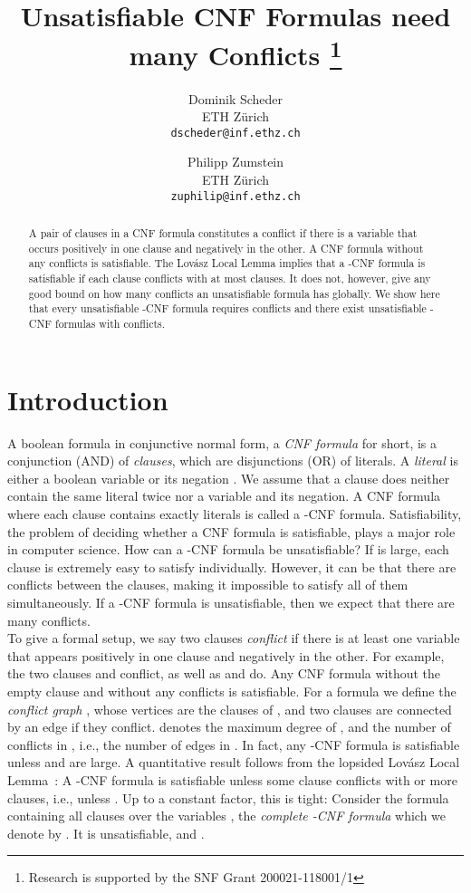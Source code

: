 \documentclass[a4paper, 11pt]{article}
\title{Unsatisfiable CNF Formulas need many Conflicts
\thanks{Research is  supported by the SNF Grant 200021-118001/1}
}
\author{Dominik Scheder\\ 
  ETH Z\"urich\\
  \texttt{dscheder@inf.ethz.ch} \and
  Philipp Zumstein\\
  ETH Z\"urich\\
  \texttt{zuphilip@inf.ethz.ch}}
\begin{document}
\maketitle

\begin{abstract} A pair of clauses in a CNF formula constitutes a
  conflict if there is a variable that occurs positively in one clause
  and negatively in the other. A CNF formula without any conflicts is
  satisfiable. The Lov\'asz Local Lemma implies that a -CNF formula
is satisfiable if each clause conflicts with at most
   clauses. It does not, however, give any good bound
  on how many conflicts an unsatisfiable formula has globally. We show
  here that every unsatisfiable -CNF formula requires
   conflicts and there exist unsatisfiable -CNF
  formulas with  conflicts.
\end{abstract}

\section{Introduction}

A boolean formula in conjunctive normal form, a {\em CNF formula} for
short, is a conjunction (AND) of {\em clauses}, which are disjunctions
(OR) of literals. A {\em literal} is either a boolean variable  or
its negation .  We assume that a clause does neither contain
the same literal twice nor a variable and its negation. A CNF formula
where each clause contains exactly  literals is called a -CNF
formula.  Satisfiability, the problem of deciding whether a CNF
formula is satisfiable, plays a major role in computer science.  How
can a -CNF formula be unsatisfiable?  If  is large, each clause
is extremely easy to satisfy individually.  However, it can be that
there are conflicts between the clauses, making it impossible to
satisfy all of them simultaneously.  If a -CNF formula is
unsatisfiable,
then we expect that there are many conflicts.\\

To give a formal setup, we say two clauses {\em conflict} if there is
at least one variable that appears positively in one clause and
negatively in the other. For example, the two clauses  and
 conflict, as well as  and  do.  Any CNF formula without the empty clause and
without any conflicts is satisfiable.  For a formula  we define the
{\em conflict graph} , whose vertices are the clauses of ,
and two clauses are connected by an edge if they conflict. 
denotes the maximum degree of , and  the number of
conflicts in , i.e., the number of edges in .  In fact, any
-CNF formula is satisfiable unless  and  are
large. A quantitative result follows from the lopsided Lov\'asz Local
Lemma~\cite{ES1991,AS2000,LS2007}: A -CNF formula  is
satisfiable unless some clause conflicts with  or more
clauses, i.e., unless . Up to a constant
factor, this is tight: Consider the formula containing all 
clauses over the variables , the {\em complete
  -CNF formula} which we denote by .  It is
unsatisfiable, and
.\\
\end{document}
